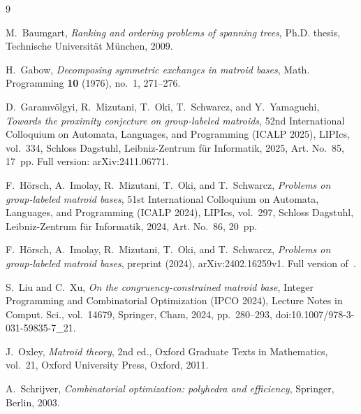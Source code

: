 \documentclass{amsart}
\theoremstyle{definition}
\theoremstyle{remark}
\begin{document}
\begin{thebibliography}{9}

M.~Baumgart, \emph{Ranking and ordering problems of spanning trees}, Ph.D. thesis, Technische Universit\"at M\"unchen, 2009.

H.~Gabow, \emph{Decomposing symmetric exchanges in matroid bases}, Math. Programming \textbf{10} (1976), no.~1, 271--276.

D.~Garamv\"olgyi, R.~Mizutani, T.~Oki, T.~Schwarcz, and Y.~Yamaguchi, \emph{Towards the proximity conjecture on group-labeled matroids}, 52nd International Colloquium on Automata, Languages, and Programming (ICALP 2025), LIPIcs, vol.~334, Schloss Dagstuhl, Leibniz-Zentrum f\"ur Informatik, 2025, Art. No.~85, 17~pp. Full version: arXiv:2411.06771.

F.~H\"orsch, A.~Imolay, R.~Mizutani, T.~Oki, and T.~Schwarcz, \emph{Problems on group-labeled matroid bases}, 51st International Colloquium on Automata, Languages, and Programming (ICALP 2024), LIPIcs, vol.~297, Schloss Dagstuhl, Leibniz-Zentrum f\"ur Informatik, 2024, Art. No.~86, 20~pp.

F.~H\"orsch, A.~Imolay, R.~Mizutani, T.~Oki, and T.~Schwarcz, \emph{Problems on group-labeled matroid bases}, preprint (2024), arXiv:2402.16259v1. Full version of~\cite{HIMOS}.

S.~Liu and C.~Xu, \emph{On the congruency-constrained matroid base}, Integer Programming and Combinatorial Optimization (IPCO 2024), Lecture Notes in Comput. Sci., vol.~14679, Springer, Cham, 2024, pp.~280--293, doi:10.1007/978-3-031-59835-7\_21.

J.~Oxley, \emph{Matroid theory}, 2nd ed., Oxford Graduate Texts in Mathematics, vol.~21, Oxford University Press, Oxford, 2011.

A.~Schrijver, \emph{Combinatorial optimization: polyhedra and efficiency}, Springer, Berlin, 2003.

\end{thebibliography}
\end{document}

